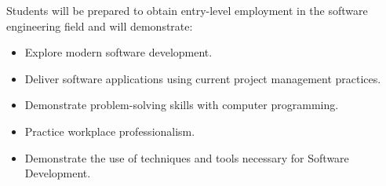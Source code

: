 Students will be prepared to obtain entry-level employment in the software engineering field and will demonstrate:
\begin{itemize}
    \item Explore modern software development.
    \item Deliver software applications using current project management practices.
    \item Demonstrate problem-solving skills with computer programming.
    \item Practice workplace professionalism.
    \item Demonstrate the use of techniques and tools necessary for Software Development.
\end{itemize}
